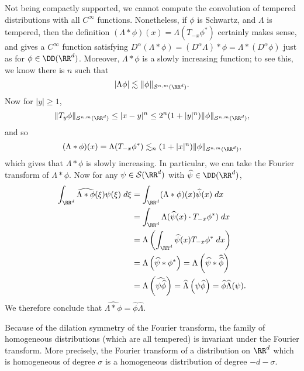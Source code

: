 Not being compactly supported, we cannot compute the convolution of tempered distributions with all $C^\infty$ functions. Nonetheless, if $\phi$ is Schwartz, and $\Lambda$ is tempered, then the definition $(\Lambda * \phi)(x) = \Lambda(T_{-x} \phi^*)$ certainly makes sense, and gives a $C^\infty$ function satisfying $D^\alpha(\Lambda * \phi) = (D^\alpha \Lambda) * \phi = \Lambda * (D^\alpha \phi)$ just as for $\phi \in \DD(\RR^d)$. Moreover, $\Lambda * \phi$ is a slowly increasing function; to see this, we know there is $n$ such that
%
\[ |\Lambda \phi| \lesssim \| \phi \|_{\mathcal{S}^{n,m}(\RR^d)}. \]
%
Now for $|y| \geq 1$,
%
\[ \| T_y \phi \|_{\mathcal{S}^{n,m}(\RR^d)} \leq |x-y|^n \leq 2^n (1 + |y|^n) \| \phi \|_{\mathcal{S}^{n,m}(\RR^d)}, \]
%
and so
%
\[ (\Lambda * \phi)(x) = \Lambda(T_{-x} \phi^*) \lesssim_n (1 + |x|^n) \| \phi \|_{\mathcal{S}^{n,m}(\RR^d)}, \]
%
which gives that $\Lambda * \phi$ is slowly increasing. In particular, we can take the Fourier transform of $\Lambda * \phi$. Now for any $\psi \in \mathcal{S}(\RR^d)$ with $\widehat{\psi} \in \DD(\RR^d)$,
%
\begin{align*}
  \int_{\RR^d} \widehat{\Lambda * \phi}(\xi) \psi(\xi)\; d\xi &= \int_{\RR^d} (\Lambda * \phi)(x) \widehat{\psi}(x)\; dx\\
  &= \int_{\RR^d} \Lambda( \widehat{\psi}(x) \cdot T_{-x} \phi^*)\; dx\\
  &= \Lambda \left( \int_{\RR^d} \widehat{\psi}(x) T_{-x} \phi^*\; dx \right)\\
  &= \Lambda \left( \widehat{\psi} * \phi^* \right) = \Lambda \left( \widehat{\psi} * \widehat{\widehat{\phi}} \right)\\
  &= \Lambda \left( \widehat{\psi \widehat{\phi}} \right) = \widehat{\Lambda} \left( \psi \widehat{\phi} \right) = \widehat{\phi} \widehat{\Lambda}(\psi).
\end{align*}
%
We therefore conclude that $\widehat{\Lambda * \phi} = \widehat{\phi} \widehat{\Lambda}$.

Because of the dilation symmetry of the Fourier transform, the family of homogeneous distributions (which are all tempered) is invariant under the Fourier transform. More precisely, the Fourier transform of a distribution on $\RR^d$ which is homogeneous of degree $\sigma$ is a homogeneous distribution of degree $-d - \sigma$.

